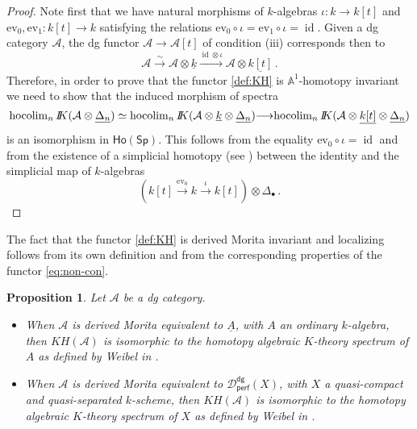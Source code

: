 \documentclass{amsart}
\numberwithin{equation}{subsection}
\newtheorem{proposition}[theorem]{Proposition}
\theoremstyle{remark}
\theoremstyle{remark}
\theoremstyle{remark}
\theoremstyle{remark}
\begin{document}
\begin{proof}
Note first that we have natural morphisms of $k$-algebras $\iota: k \to k[t]$ and $\mathrm{ev}_0, \mathrm{ev}_1: k[t] \to k$ satisfying the relations $\mathrm{ev}_0 \circ \iota =\mathrm{ev}_1 \circ \iota=\operatorname{id}$. Given a dg category ${{\mathcal A}}$, the dg functor ${{\mathcal A}} \to {{\mathcal A}}[t]$ of condition (iii) corresponds then to 
$${{\mathcal A}} \stackrel{\sim}{\longrightarrow} {{\mathcal A}} \otimes \underline{k} \stackrel{\operatorname{id} \otimes \iota}{\longrightarrow} {{\mathcal A}}\otimes \underline{k[t]}\,.$$
Therefore, in order to prove that the functor \eqref{def:KH} is ${\mathbb{A}}^1$-homotopy invariant we need to show that the induced morphism of spectra
$$ \mathrm{hocolim}_n\, {I\mspace{-6.mu}K}({{\mathcal A}} \otimes \underline{\Delta_n}) \simeq \mathrm{hocolim}_n\, {I\mspace{-6.mu}K}({{\mathcal A}} \otimes \underline{k} \otimes \underline{\Delta_n}) {\longrightarrow} \mathrm{hocolim}_n\, {I\mspace{-6.mu}K}({{\mathcal A}} \otimes \underline{k[t]}\otimes \underline{\Delta_n})$$
is an isomorphism in ${\mathsf{Ho}}({\mathsf{Sp}})$. This follows from the equality $\mathrm{ev}_0\circ \iota = \operatorname{id}$ and from the existence of a simplicial homotopy (see \cite[Proposition~2.4]{Weibel-KV}) between the identity and the simplicial map of $k$-algebras
$$ (k[t] \stackrel{\mathrm{ev}_0}{\longrightarrow} k \stackrel{\iota}{\longrightarrow} k[t]) \otimes \Delta_{\bullet}\,.$$
\end{proof}
The fact that the functor \eqref{def:KH} is derived Morita invariant and localizing follows from its own definition and from the corresponding properties of the functor \eqref{eq:non-con}.
\begin{proposition}\label{prop:agreementKH}
Let ${{\mathcal A}}$ be a dg category.
\begin{itemize}
\item[(a)] When ${{\mathcal A}}$ is derived Morita equivalent to $\underline{A}$, with $A$ an ordinary $k$-algebra, then $KH({{\mathcal A}})$ is isomorphic to the homotopy algebraic $K$-theory spectrum of $A$ as defined by Weibel in \cite[Definition~1.1]{Weibel-KH}. 
\item[(b)]  When ${{\mathcal A}}$ is derived Morita equivalent to ${{\mathcal D}}_{\mathsf{perf}}^{\mathsf{dg}}(X)$, with $X$ a quasi-compact and quasi-separated $k$-scheme, then $KH({{\mathcal A}})$ is isomorphic to the homotopy algebraic $K$-theory spectrum of $X$ as defined by Weibel in \cite[Definition~6.5]{Weibel-KH}.
\end{itemize}
\end{proposition}
\end{document}
